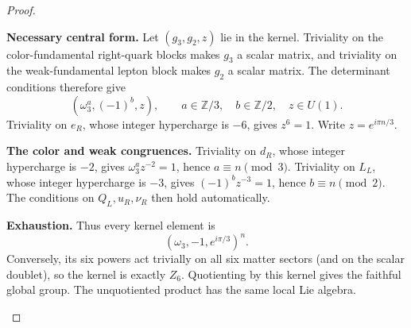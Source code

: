 \documentclass[11pt,a4paper]{article}
\begin{document}
\begin{proof}

\begin{proofsteps}
\item \textbf{Necessary central form.}
Let \((g_3,g_2,z)\) lie in the kernel.  Triviality on the color-fundamental
right-quark blocks makes \(g_3\) a scalar matrix, and triviality on the
weak-fundamental lepton block makes \(g_2\) a scalar matrix.  The determinant
conditions therefore give
\[
(\omega_3^a,(-1)^b,z),
\qquad
a\in\mathbb Z/3,\quad b\in\mathbb Z/2,\quad z\in U(1).
\]
Triviality on \(e_R\), whose integer hypercharge is \(-6\), gives
\(z^6=1\).  Write \(z=e^{i\pi n/3}\).

\item \textbf{The color and weak congruences.}
Triviality on \(d_R\), whose integer hypercharge is \(-2\), gives
\(\omega_3^a z^{-2}=1\), hence \(a\equiv n\pmod3\).
Triviality on \(L_L\), whose integer hypercharge is \(-3\), gives
\((-1)^b z^{-3}=1\), hence \(b\equiv n\pmod2\).
The conditions on \(Q_L,u_R,\nu_R\) then hold automatically.

\item \textbf{Exhaustion.}
Thus every kernel element is
\[
(\omega_3,-1,e^{i\pi/3})^n.
\]
Conversely, its six powers act trivially on all six matter sectors (and on
the scalar doublet), so the kernel is exactly \(Z_6\).  Quotienting by this
kernel gives the faithful global group.  The unquotiented product has the
same local Lie algebra.
\end{proofsteps}
\end{proof}
\end{document}
